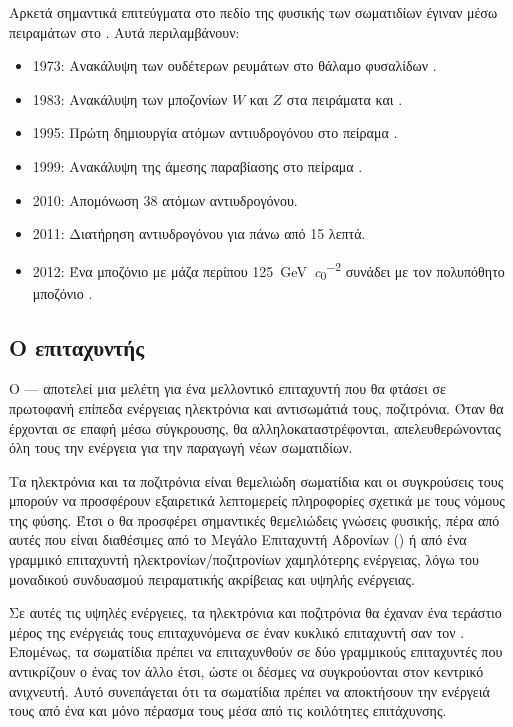 Αρκετά σημαντικά επιτεύγματα στο πεδίο της φυσικής των σωματιδίων έγιναν μέσω πειραμάτων στο . Αυτά περιλαμβάνουν:
\begin{itemize}
\item 1973: Ανακάλυψη των ουδέτερων ρευμάτων στο θάλαμο φυσαλίδων .
\item 1983: Ανακάλυψη των μποζονίων $W$ και $Z$ στα πειράματα  και .
\item 1995: Πρώτη δημιουργία ατόμων αντιυδρογόνου στο πείραμα .
\item 1999: Ανακάλυψη της άμεσης παραβίασης  στο πείραμα .
\item 2010: Απομόνωση 38 ατόμων αντιυδρογόνου.
\item 2011: Διατήρηση αντιυδρογόνου για πάνω από 15 λεπτά.
\item 2012: Ένα μποζόνιο με μάζα περίπου \SI[per-mode = symbol]{125}{\giga \electronvolt \per  \clight \squared} συνάδει με τον πολυπόθητο μποζόνιο .
\end{itemize}


\subsection{Ο επιταχυντής }


Ο  --- αποτελεί μια μελέτη για ένα μελλοντικό επιταχυντή που θα φτάσει σε πρωτοφανή επίπεδα ενέργειας ηλεκτρόνια και αντισωμάτιά τους, ποζιτρόνια. 
Όταν θα έρχονται σε επαφή μέσω σύγκρουσης, θα αλληλοκαταστρέφονται, απελευθερώνοντας όλη τους την ενέργεια για την παραγωγή νέων σωματιδίων.


Τα ηλεκτρόνια και τα ποζιτρόνια είναι θεμελιώδη σωματίδια και οι συγκρούσεις τους μπορούν να προσφέρουν εξαιρετικά λεπτομερείς πληροφορίες σχετικά με τους νόμους της φύσης. 
Έτσι ο  θα προσφέρει σημαντικές θεμελιώδεις γνώσεις φυσικής, πέρα από αυτές που είναι διαθέσιμες από το Μεγάλο Επιταχυντή Αδρονίων () ή από ένα γραμμικό επιταχυντή ηλεκτρονίων/ποζιτρονίων χαμηλότερης ενέργειας, λόγω του μοναδικού συνδυασμού πειραματικής ακρίβειας και υψηλής ενέργειας.

Σε αυτές τις υψηλές ενέργειες, τα ηλεκτρόνια και ποζιτρόνια θα έχαναν ένα τεράστιο μέρος της ενέργειάς τους επιταχυνόμενα σε έναν κυκλικό επιταχυντή σαν τον . 
Επομένως, τα σωματίδια πρέπει να επιταχυνθούν σε δύο γραμμικούς επιταχυντές που αντικρίζουν ο ένας τον άλλο έτσι, ώστε οι δέσμες να συγκρούονται στον κεντρικό ανιχνευτή. 
Αυτό συνεπάγεται ότι τα σωματίδια πρέπει να αποκτήσουν την ενέργειά τους από ένα και μόνο πέρασμα τους μέσα από τις κοιλότητες επιτάχυνσης.

